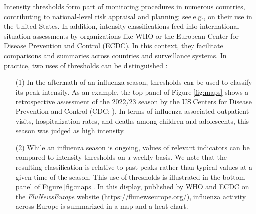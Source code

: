 \documentclass[12pt]{article}
\begin{document}
Intensity thresholds form part of monitoring procedures in numerous countries, contributing to national-level risk appraisal and planning; see e.g., \cite{CDC2024} on their use in the United States. In addition, intensity classifications feed into international situation assessments by organizations like WHO or the European Center for Disease Prevention and Control (ECDC). In this context, they facilitate comparisons and summaries across countries and surveillance systems. In practice, two uses of thresholds can be distinguished \citep{CDC2024}:
\begin{itemize}
\item[(1)] In the aftermath of an influenza season, thresholds can be used to classify its peak intensity. As an example, the top panel of Figure \ref{fig:maps} shows a retrospective assessment of the 2022/23 season by the US Centers for Disease Prevention and Control (CDC; \citealt{White2023}). In terms of influenza-associated outpatient visits, hospitalization rates, and deaths among children and adolescents, this season was judged as high intensity.
\item[(2)] While an influenza season is ongoing, values of relevant indicators can be compared to intensity thresholds on a weekly basis. We note that the resulting classification is relative to past peaks rather than typical values at a given time of the season. This use of thresholds is illustrated in the bottom panel of Figure \ref{fig:maps}. In this display, published by WHO and ECDC on the \textit{FluNewsEurope} website (\url{https://flunewseurope.org/}), influenza activity across Europe is summarized in a map and a heat chart.
\end{itemize}
\end{document}
